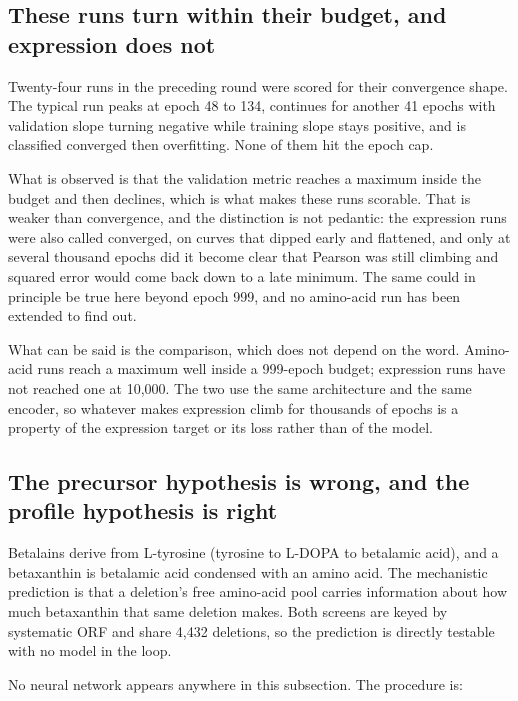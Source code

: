 \subsection{These runs turn within their budget, and expression does not}

Twenty-four runs in the preceding round were scored for their convergence shape. The
typical run peaks at epoch 48 to 134, continues for another 41 epochs with validation slope
turning negative while training slope stays positive, and is classified converged then
overfitting. None of them hit the epoch cap.

What is observed is that the validation metric reaches a maximum inside the budget and then
declines, which is what makes these runs scorable. That is weaker than convergence, and the
distinction is not pedantic: the expression runs were also called converged, on curves that
dipped early and flattened, and only at several thousand epochs did it become clear that
Pearson was still climbing and squared error would come back down to a late minimum. The
same could in principle be true here beyond epoch 999, and no amino-acid run has been
extended to find out.

What can be said is the comparison, which does not depend on the word. Amino-acid runs reach
a maximum well inside a 999-epoch budget; expression runs have not reached one at 10,000.
The two use the same architecture and the same encoder, so whatever makes expression climb
for thousands of epochs is a property of the expression target or its loss rather than of the
model.

\subsection{The precursor hypothesis is wrong, and the profile hypothesis is right}

Betalains derive from L-tyrosine (tyrosine to L-DOPA to betalamic acid), and a betaxanthin
is betalamic acid condensed with an amino acid. The mechanistic prediction is that a
deletion's free amino-acid pool carries information about how much betaxanthin that same
deletion makes. Both screens are keyed by systematic ORF and share 4,432 deletions, so the
prediction is directly testable with no model in the loop.

 No neural network appears anywhere in this subsection. The procedure is:

